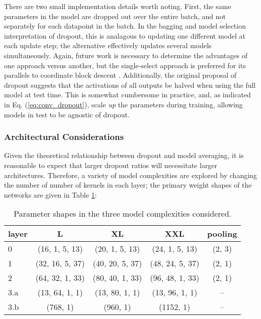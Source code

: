 There are two small implementation details worth noting.
First, the same parameters in the model are dropped out over the entire batch, and not separately for each datapoint in the batch.
In the bagging and model selection interpretation of dropout, this is analagous to updating one different model at each update step; the alternative effectively updates several models simultaneously.
Again, future work is necessary to determine the advantages of one approach versus another, but the single-select approach is preferred for its parallels to coordinate block descent \cite{somebody}.
Additionally, the original proposal of dropout suggests that the activations of all outputs be halved when using the full model at test time.
This is somewhat cumbersome in practice, and, as indicated in Eq. (\ref{eq:conv_dropout}), scale \emph{up} the parameters during training, allowing models in test to be agnostic of dropout.


\subsubsection{Architectural Considerations}
\label{subsubsec:arch}

Given the theoretical relationship between dropout and model averaging, it is reasonable to expect that larger dropout ratios will necessitate larger architectures.
Therefore, a variety of model complexities are explored by changing the number of number of kernels in each layer; the primary weight shapes of the networks are given in Table \ref{tab:lvce_archs}:

\begin{table}[t]
\begin{center}
\caption{Parameter shapes in the three model complexities considered.}
\label{tab:lvce_archs}
\begin{tabular}{l | c | c | c | c }
layer & L & XL & XXL & pooling\\
\hline
0   & (16,  1, 5, 13) & (20,  1, 5, 13) & (24,  1, 5, 13) & (2, 3) \\
1   & (32, 16, 5, 37) & (40, 20, 5, 37) & (48, 24, 5, 37) & (2, 1) \\
2   & (64, 32, 1, 33) & (80, 40, 1, 33) & (96, 48, 1, 33) & (2, 1) \\
3.a & (13, 64, 1,  1) & (13, 80, 1,  1) & (13, 96, 1,  1) &   --   \\
3.b &    (768, 1)     &     (960, 1)    &    (1152, 1)    &   --   \\
\hline
\end{tabular}
\end{center}
\end{table}

